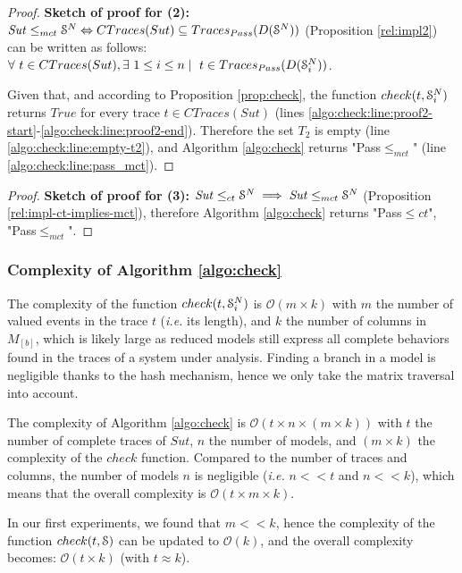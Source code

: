 \begin{proof}
    \textbf{Sketch of proof for (2):} $\mathit{Sut} \leq_{mct} \EuScript{S}^{N}
    \Leftrightarrow CTraces(Sut) \subseteq Traces_{Pass}(D(\EuScript{S}^N))$
    (Proposition \ref{rel:impl2}) can be written as
    follows: $\forall ~t \in CTraces(Sut), \exists ~1
    \leq i \leq n \mid ~t \in Traces_{Pass}(D(\EuScript{S}_i^{N}))$.

    Given that, and according to Proposition
    \ref{prop:check}, the function $check(t, \EuScript{S}_i^N)$ returns $True$ for
    every trace $t \in CTraces(Sut)$ (lines
    \ref{algo:check:line:proof2-start}-\ref{algo:check:line:proof2-end}).
    Therefore the set $T_2$ is empty
    (line \ref{algo:check:line:empty-t2}), and Algorithm
    \ref{algo:check} returns "Pass$\leq_{mct}$" (line
    \ref{algo:check:line:pass_mct}).
\end{proof}


\begin{proof}
    \textbf{Sketch of proof for (3):} $\mathit{Sut} \leq_{ct}
    \EuScript{S}^{N} \implies \mathit{Sut} \leq_{mct}
    \EuScript{S}^{N}$ (Proposition
    \ref{rel:impl-ct-implies-mct}), therefore Algorithm
    \ref{algo:check} returns "Pass$\leq{ct}$",
    "Pass$\leq_{mct}$".
\end{proof}

\subsubsection{Complexity of Algorithm \ref{algo:check}}

The complexity of the function $check(t, \EuScript{S}_i^{N})$ is
$\mathcal{O}(m \times k)$ with $m$ the number of valued events in
the trace $t$ (\emph{i.e.} its length), and $k$ the number of
columns in $M_{[b]}$, which is likely large as reduced models
still express all complete behaviors found in the traces of a
system under analysis. Finding a branch in a model is negligible
thanks to the hash mechanism, hence we only take the matrix
traversal into account.

The complexity of Algorithm \ref{algo:check} is $\mathcal{O}(t
\times n \times (m \times k))$ with $t$ the number of complete
traces of $\mathit{Sut}$, $n$ the number of models, and $(m
\times k)$ the complexity of the $check$ function.  Compared to
the number of traces and columns, the number of models $n$ is
negligible (\emph{i.e.} $n << t$ and $n << k$), which means that
the overall complexity is $\mathcal{O}(t \times m \times k)$.

In our first experiments, we found that $m << k$, hence the
complexity of the function $check(t, \EuScript{S})$ can be
updated to $\mathcal{O}(k)$, and the overall complexity
becomes: $\mathcal{O}(t \times k)$ (with $t \approx k$).

\clearpage
